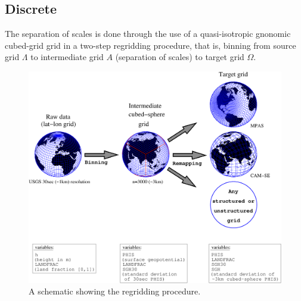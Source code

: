 \documentclass[gmd]{copernicus}
\begin{document}
{\color{red}{[julio: continuous definition of dominant orientation of orography with this notation?]}}
\subsection{Discrete}
The separation of scales is done through the use of a quasi-isotropic gnonomic cubed-grid grid in a two-step regridding procedure, that is, binning from source grid $\Lambda$ to intermediate grid $A$ (separation of scales) to target grid $\Omega$. 

\begin{figure}[t]
\vspace*{2mm}
\begin{center}
\includegraphics[width=12cm]{fig/schematic}
\end{center}
  \caption{A schematic showing the regridding procedure.}\label{fig:schematic}
\end{figure}
\end{document}
